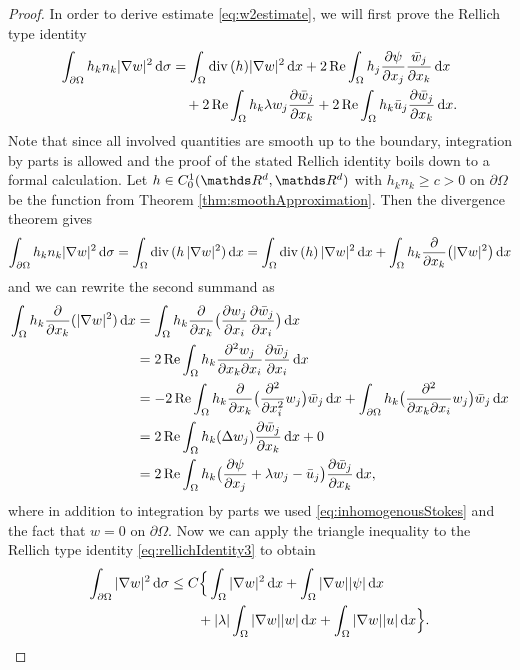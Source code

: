 \begin{proof}
  In order to derive estimate \eqref{eq:w2estimate}, we will first prove the Rellich type identity
  \begin{align}
    \label{eq:rellichIdentity3}
    \begin{alignedat}{1}
    \int_{\partial\Omega} h_k n_k |\nabla w|^2 \, {\operatorname{d}\!{\sigma}}
    &= \int_\Omega \mathrm{div\,} (h) |\nabla w|^2 \, {\operatorname{d}\!{x}} + 2 \operatorname{Re} \int_{\Omega} h_j \frac{\partial \psi}{\partial x_j} \frac{\bar w_j}{\partial x_k}\, {\operatorname{d}\!{x}}   \\
    &\quad + 2 \operatorname{Re} \int_\Omega h_k \lambda w_j \frac{\partial\bar w_j}{\partial x_k} + 2 \operatorname{Re} \int_\Omega h_k \bar u_j \frac{\partial \bar w_j}{\partial x_k} \, {\operatorname{d}\!{x}}. 
    \end{alignedat}
  \end{align} 
  Note that since all involved quantities are smooth up to the boundary, integration by parts is allowed and the proof of the stated  Rellich identity boils down to a formal calculation.
  Let $h \in C_0^1(\R^d, \R^d)$ with $h_k n_k \geq c > 0$ on $\partial \Omega$ be the function from Theorem \ref{thm:smoothApproximation}.
  Then the divergence theorem gives
  \begin{align*}
    \int_{\partial\Omega} h_k n_k |\nabla w|^2 \, {\operatorname{d}\!{\sigma}}
    = \int_{\Omega} \mathrm{div\,} (h\, |\nabla w|^2) \, {\operatorname{d}\!{x}} 
    = \int_\Omega \mathrm{div\,} (h)\, |\nabla w|^2 \, {\operatorname{d}\!{x}} + \int_\Omega h_k \frac{\partial}{\partial x_k} \big( |\nabla w|^2 \big) \, {\operatorname{d}\!{x}}
  \end{align*}
  and we can rewrite the second summand as
  \begin{align*}
    \int_{\Omega} h_k \frac{\partial}{\partial x_k} (|\nabla w|^2) \, {\operatorname{d}\!{x}}
    &= \int_{\Omega} h_k \frac{\partial}{\partial x_k} \big( \frac{\partial w_j}{\partial x_i} \frac{\partial \bar w_j}{\partial x_i}\big) \, {\operatorname{d}\!{x}} \\
    &= 2 \operatorname{Re} \int_\Omega h_k \frac{\partial^2 w_j}{\partial x_k \partial x_i} \frac{\partial \bar w_j}{\partial x_i} \, {\operatorname{d}\!{x}} \\
    &= - 2 \operatorname{Re} \int_\Omega h_k \frac{\partial}{\partial x_k} \big( \frac{\partial^2}{\partial x_i^2} w_j \big) \bar w_j \, {\operatorname{d}\!{x}} + \int_{\partial\Omega} h_k \big( \frac{\partial^2}{\partial x_k \partial x_i} w_j \big) \bar w_j \, {\operatorname{d}\!{x}}\\
    &= 2 \operatorname{Re} \int_\Omega h_k ( \Delta w_j ) \frac{\partial \bar w_j}{\partial x_k} \, {\operatorname{d}\!{x}} + 0 \\
    &= 2 \operatorname{Re} \int_\Omega h_k \big( \frac{\partial \psi}{\partial x_j} + \lambda w_j - \bar u_j \big) \frac{\partial \bar w_j}{\partial x_k} \, {\operatorname{d}\!{x}},
  \end{align*}
  where in addition to integration by parts we used \eqref{eq:inhomogenousStokes} and the fact that $w = 0$ on $\partial\Omega$.
  Now we can apply the triangle inequality to the Rellich type identity \eqref{eq:rellichIdentity3} to obtain
  \begin{align}
    \int_{\partial\Omega} |\nabla w|^2 \, {\operatorname{d}\!{\sigma}} 
    &\leq C \Big\{ \int_\Omega |\nabla w|^2 \, {\operatorname{d}\!{x}} + \int_\Omega |\nabla w | |\psi| \, {\operatorname{d}\!{x}} \nonumber\\
    &\qquad + |\lambda| \int_\Omega |\nabla w| |w| \, {\operatorname{d}\!{x}} + \int_\Omega |\nabla w| |u| \, {\operatorname{d}\!{x}} \Big\}. \label{eq:rellichInequality3}
  \end{align}


\end{proof}
